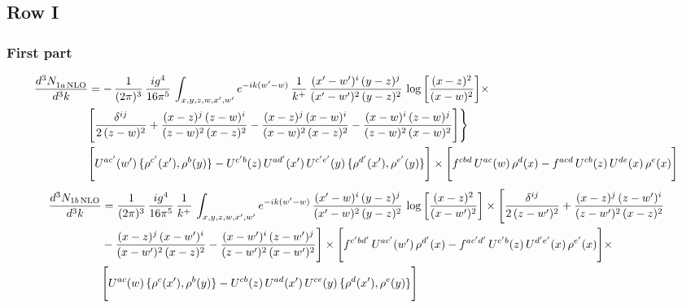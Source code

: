 \documentclass[9pt]{article}
\numberwithin{equation}{section}
\begin{document}
\subsection{Row I}
\subsubsection{First part}
\begin{align}
 \frac{d^{3}N_{1a\,\rm NLO}^{\rm}}{d^{3}k}  & = -\,\frac{1}{(2\pi)^{3}}\,\frac{ig^{4}}{16\pi^{5}}\,\int_{x,y,z,w,x',w^{\prime}} e^{-ik(w^{\prime}-w)}\,\frac{1}{k^{+}}\, \frac{(x'-w')^{i}\,(y-z)^{j}}{(x'-w')^{2}\,(y-z)^{2}}\,\log{\left[\frac{(x-z)^{2}}{(x-w)^{2}}\right]}\times\notag \\ &  \Bigg[\frac{\delta^{ij}}{2\,(z-w)^{2}}+\frac{(x-z)^{j}\,(z-w)^{i}}{(z-w)^{2}\,(x-z)^{2}}-\frac{(x-z)^{j}\,(x-w)^{i}}{(x-w)^{2}\,(x-z)^{2}}-\frac{(x-w)^{i}\,(z-w)^{j}}{(z-w)^{2}\,(x-w)^{2}}\Bigg]\Bigg\} \notag \\ & \Bigg[U^{ac'}(w')\,\{\rho^{c'}(x'),\rho^{b}(y)\}-U^{c'b}(z)\,U^{ad'}(x')\,U^{c'e'}(y)\, \{\rho^{d'}(x'),\rho^{e'}(y)\}\Bigg]\times \Bigg[f^{cbd}\,U^{ac}(w)\,\rho^{d}(x)-f^{acd}\, U^{cb}(z)\,U^{de}(x)\,\rho^{e}(x)\Bigg]
\end{align}
\begin{align}
\frac{d^{3}N_{1b\, \rm NLO}}{d^{3}k} & =  \frac{1}{(2\pi)^{3}}\,\frac{ig^{4}}{16\pi^{5}}\,\frac{1}{k^{+}}\,\int_{x,y,z,w,x',w^{\prime}} e^{-ik(w^{\prime}-w)}\,  \frac{(x'-w)^{i}\,(y-z)^{j}}{(x'-w)^{2}\,(y-z)^{2}}\,\log{\left[\frac{(x-z)^{2}}{(x-w')^{2}}\right]}\times \Bigg[\frac{\delta^{ij}}{2\,(z-w')^{2}}+\frac{(x-z)^{j}\,(z-w')^{i}}{(z-w')^{2}\,(x-z)^{2}}\notag \\ &  -\frac{(x-z)^{j}\,(x-w')^{i}}{(x-w')^{2}\,(x-z)^{2}} -\frac{(x-w')^{i}\,(z-w')^{j}}{(z-w')^{2}\,(x-w')^{2}}\Bigg] \times\Bigg[f^{c'bd'}\,U^{ac'}(w')\,\rho^{d'}(x)-f^{ac'd'}\, U^{c'b}(z)\,U^{d'e'}(x)\,\rho^{e'}(x)\Bigg] \times\notag \\ &  \Bigg[U^{ac}(w)\,\{\rho^{c}(x'),\rho^{b}(y)\}-U^{cb}(z)\,U^{ad}(x')\,U^{ce}(y)\, \{\rho^{d}(x'),\rho^{e}(y)\}\Bigg]
\end{align}
\end{document}
